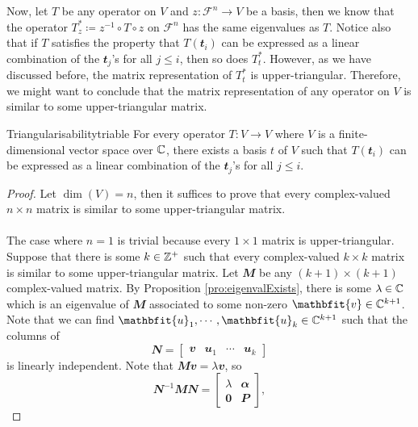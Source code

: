\documentclass[math, code]{amznotes}
\theoremstyle{remark}
\newcommand{\zero}{\mathbf{0}}
\begin{document}
Now, let $T$ be any operator on $V$ and $z \colon \mathcal{F}^n \to V$ be a basis, then we know that the operator $T^*_z \coloneqq z^{-1} \circ T \circ z$ on $\mathcal{F}^n$ has the same eigenvalues as $T$. Notice also that if $T$ satisfies the property that $T(\mathbfit{t}_i)$ can be expressed as a linear combination of the $\mathbfit{t}_j$'s for all $j \leq i$, then so does $T^*_t$. However, as we have discussed before, the matrix representation of $T^*_t$ is upper-triangular. Therefore, we might want to conclude that the matrix representation of any operator on $V$ is similar to some upper-triangular matrix.
\begin{thmbox}{Triangularisability}{triable}
    For every operator $T \colon V \to V$ where $V$ is a finite-dimensional vector space over $\mathbb{C}$, there exists a basis $t$ of $V$ such that $T(\mathbfit{t}_i)$ can be expressed as a linear combination of the $\mathbfit{t}_j$'s for all $j \leq i$.
    \tcblower
    \begin{proof}
        Let $\dim(V) = n$, then it suffices to prove that every complex-valued $n \times n$ matrix is similar to some upper-triangular matrix. 
        \\\\
        The case where $n = 1$ is trivial because every $1 \times 1$ matrix is upper-triangular. Suppose that there is some $k \in \mathbb{Z}^+$ such that every complex-valued $k \times k$ matrix is similar to some upper-triangular matrix. Let $\mathbfit{M}$ be any $(k + 1) \times (k + 1)$ complex-valued matrix. By Proposition \ref{pro:eigenvalExists}, there is some $\lambda \in \mathbb{C}$ which is an eigenvalue of $\mathbfit{M}$ associated to some non-zero $\mathbfit{v} \in \C^{k + 1}$. Note that we can find $\mathbfit{u}_1, \cdots, \mathbfit{u}_k \in \C^{k + 1}$ such that the columns of 
        \begin{equation*}
            \mathbfit{N} = \begin{bmatrix}
                \mathbfit{v} & \mathbfit{u}_1 & \cdots & \mathbfit{u}_k
            \end{bmatrix}
        \end{equation*}
        is linearly independent. Note that $\mathbfit{Mv} = \lambda\mathbfit{v}$, so
        \begin{equation*}
            \mathbfit{N}^{-1}\mathbfit{MN} = \begin{bmatrix}
                \lambda & \mathbfit{\alpha} \\
                \zero & \mathbfit{P}
            \end{bmatrix},

\end{equation*}
\end{proof}
\end{thmbox}
\end{document}
